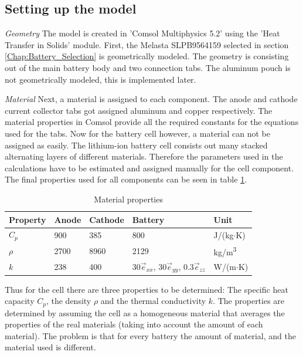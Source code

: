 \subsection{Setting up the model}
\textit{Geometry}\newline
The model is created in 'Comsol Multiphysics 5.2' using the 'Heat Transfer in Solids' module. First, the Melasta SLPB9564159 selected in section \ref{Chap:Battery_Selection} is geometrically modeled. The geometry is consisting out of the main battery body and two connection tabs. The aluminum pouch is not geometrically modeled, this is implemented later.

\textit{Material}\newline
Next, a material is assigned to each component. The anode and cathode current collector tabs got assigned aluminum and copper respectively. The material properties in Comsol provide all the required constants for the equations used for the tabs. 
Now for the battery cell however, a material can not be assigned as easily. The lithium-ion battery cell consists out many stacked alternating layers of different materials. Therefore the parameters used in the calculations have to be estimated and assigned manually for the cell component. The final properties used for all components can be seen in table \ref{Table:Material_Properties}.

\begin{table}[H]
\centering
\caption{Material properties}
\label{Table:Material_Properties}
\begin{tabular}{|l|l|l|l|l|}
\hline
Property & Anode & Cathode & Battery & Unit                   \\ \hline \hline
$C_p$       & 900   & 385     & 800     & J/(kg$\cdot$K)               \\
$\rho$      & 2700  & 8960    & 2129    & kg/m\textsuperscript{3} \\
$k$        & 238   & 400     & 30$\vec{e}_{xx}$, 30$\vec{e}_{yy}$, 0.3$\vec{e}_{zz}$      & W/(m$\cdot$K)            	  \\ \hline   
\end{tabular}
\end{table}

Thus for the cell there are three properties to be determined: The specific heat capacity $C_p$, the density $\rho$ and the thermal conductivity $k$. The properties are determined by assuming the cell as a homogeneous material that averages the properties of the real materials (taking into account the amount of each material). The problem is that for every battery the amount of material, and the material used is different. 

